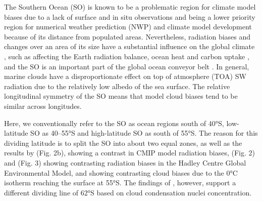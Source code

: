 \documentclass[draft]{agujournal2019}
\begin{document}
The Southern Ocean (SO) is known to be a problematic region for climate model
biases  due to a lack of
surface and in situ observations and being a lower priority region for
numerical weather prediction (NWP) and climate model development because of its
distance from populated areas.  Nevertheless, radiation biases and changes over
an area of its size have a substantial influence on the global climate
, such as affecting the Earth radiation balance, ocean heat
and carbon uptake , and the SO is an important part of the
global ocean conveyor belt . In general, marine clouds have a
disproportionate effect on top of atmosphere (TOA) SW radiation due to the
relatively low albedo of the sea surface.  The relative longitudinal symmetry
of the SO means that model cloud biases tend to be similar across longitudes.

Here, we conventionally refer to the SO as ocean regions south of 40°S,
low-latitude SO as 40--55°S and high-latitude SO as south of 55°S. The reason
for this dividing latitude is to split the SO into about two equal zones, as
well as the results by  (Fig. 2b), showing a contrast in
CMIP model radiation biases,  (Fig. 2) and
 (Fig. 3) showing contrasting radiation biases in the Hadley
Centre Global Environmental Model, and  showing contrasting
cloud biases due to the 0°C isotherm reaching the surface at 55°S. The findings
of , however, support a different dividing line of 62°S based on
cloud condensation nuclei concentration.
\end{document}
